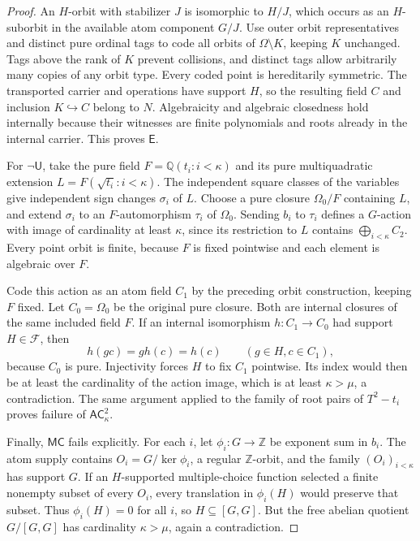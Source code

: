 \documentclass[11pt,a4paper]{article}
\theoremstyle{definition}\newtheorem{definition}[theorem]{Definition}
\theoremstyle{remark}\newtheorem{remark}[theorem]{Remark}
\newcommand{\E}{\mathsf E}\newcommand{\U}{\mathsf U}
\newcommand{\Q}{\mathbb Q}\newcommand{\F}{\mathbb F}
\begin{document}
\begin{proof}
An $H$-orbit with stabilizer $J$ is isomorphic to $H/J$, which occurs as an $H$-suborbit in the available atom component $G/J$. Use outer orbit representatives and distinct pure ordinal tags to code all orbits of $\Omega\setminus K$, keeping $K$ unchanged. Tags above the rank of $K$ prevent collisions, and distinct tags allow arbitrarily many copies of any orbit type. Every coded point is hereditarily symmetric. The transported carrier and operations have support $H$, so the resulting field $C$ and inclusion $K\hookrightarrow C$ belong to $N$. Algebraicity and algebraic closedness hold internally because their witnesses are finite polynomials and roots already in the internal carrier. This proves $\E$.

For $\neg\U$, take the pure field $F=\Q(t_i:i<\kappa)$ and its pure multiquadratic extension $L=F(\sqrt{t_i}:i<\kappa)$. The independent square classes of the variables give independent sign changes $\sigma_i$ of $L$. Choose a pure closure $\Omega_0/F$ containing $L$, and extend $\sigma_i$ to an $F$-automorphism $\tau_i$ of $\Omega_0$. Sending $b_i$ to $\tau_i$ defines a $G$-action with image of cardinality at least $\kappa$, since its restriction to $L$ contains $\bigoplus_{i<\kappa}C_2$. Every point orbit is finite, because $F$ is fixed pointwise and each element is algebraic over $F$.

Code this action as an atom field $C_1$ by the preceding orbit construction, keeping $F$ fixed. Let $C_0=\Omega_0$ be the original pure closure. Both are internal closures of the same included field $F$. If an internal isomorphism $h:C_1\to C_0$ had support $H\in\mathcal F$, then
\[
h(gc)=g h(c)=h(c)\qquad(g\in H,c\in C_1),
\]
because $C_0$ is pure. Injectivity forces $H$ to fix $C_1$ pointwise. Its index would then be at least the cardinality of the action image, which is at least $\kappa>\mu$, a contradiction. The same argument applied to the family of root pairs of $T^2-t_i$ proves failure of $\mathsf{AC}_{\kappa}^{2}$.

Finally, $\mathsf{MC}$ fails explicitly. For each $i$, let $\phi_i:G\to\mathbb Z$ be exponent sum in $b_i$. The atom supply contains $O_i=G/\ker\phi_i$, a regular $\mathbb Z$-orbit, and the family $(O_i)_{i<\kappa}$ has support $G$. If an $H$-supported multiple-choice function selected a finite nonempty subset of every $O_i$, every translation in $\phi_i(H)$ would preserve that subset. Thus $\phi_i(H)=0$ for all $i$, so $H\subseteq[G,G]$. But the free abelian quotient $G/[G,G]$ has cardinality $\kappa>\mu$, again a contradiction.
\end{proof}
\end{document}
